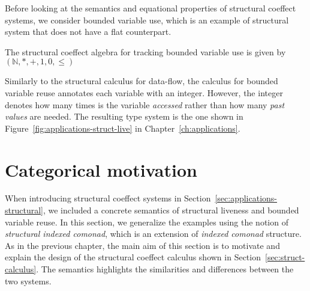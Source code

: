 Before looking at the semantics and equational properties of structural coeffect systems, 
we consider bounded variable use, which is an example of structural system that does not
have a flat counterpart.

\begin{example}
The structural coeffect algebra for tracking bounded variable use is given by
$(\mathbb{N}, \ast, +, 1, 0, \leq)$
\end{example}

\noindent
Similarly to the structural calculus for data-flow, the calculus for bounded variable reuse
annotates each variable with an integer. However, the integer denotes how many times is the variable 
\emph{accessed} rather than how many \emph{past values} are needed. The resulting type system is 
the one shown in Figure~\ref{fig:applications-struct-live} in Chapter~\ref{ch:applications}.

%                                              

\section{Categorical motivation}
\label{sec:struct-semantics}

When introducing structural coeffect systems in Section~\ref{sec:applications-structural}, we 
included a concrete semantics of structural liveness and bounded variable reuse. In this section,
we generalize the examples using the notion of \emph{structural indexed comonad}, which is an 
extension of \emph{indexed comonad} structure. As in the previous chapter, the main aim of this 
section is to motivate and explain the design of the structural coeffect calculus shown in 
Section~\ref{sec:struct-calculus}. The semantics highlights the similarities and differences 
between the two systems.

